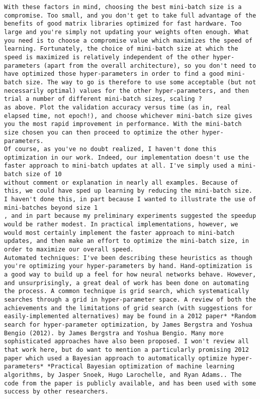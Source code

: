 \begin{lstlisting}
With these factors in mind, choosing the best mini-batch size is a compromise. Too small, and you don't get to take full advantage of the benefits of good matrix libraries optimized for fast hardware. Too large and you're simply not updating your weights often enough. What you need is to choose a compromise value which maximizes the speed of learning. Fortunately, the choice of mini-batch size at which the speed is maximized is relatively independent of the other hyper-parameters (apart from the overall architecture), so you don't need to have optimized those hyper-parameters in order to find a good mini-batch size. The way to go is therefore to use some acceptable (but not necessarily optimal) values for the other hyper-parameters, and then trial a number of different mini-batch sizes, scaling ?
as above. Plot the validation accuracy versus time (as in, real elapsed time, not epoch!), and choose whichever mini-batch size gives you the most rapid improvement in performance. With the mini-batch size chosen you can then proceed to optimize the other hyper-parameters.
Of course, as you've no doubt realized, I haven't done this optimization in our work. Indeed, our implementation doesn't use the faster approach to mini-batch updates at all. I've simply used a mini-batch size of 10
without comment or explanation in nearly all examples. Because of this, we could have sped up learning by reducing the mini-batch size. I haven't done this, in part because I wanted to illustrate the use of mini-batches beyond size 1
, and in part because my preliminary experiments suggested the speedup would be rather modest. In practical implementations, however, we would most certainly implement the faster approach to mini-batch updates, and then make an effort to optimize the mini-batch size, in order to maximize our overall speed.
Automated techniques: I've been describing these heuristics as though you're optimizing your hyper-parameters by hand. Hand-optimization is a good way to build up a feel for how neural networks behave. However, and unsurprisingly, a great deal of work has been done on automating the process. A common technique is grid search, which systematically searches through a grid in hyper-parameter space. A review of both the achievements and the limitations of grid search (with suggestions for easily-implemented alternatives) may be found in a 2012 paper* *Random search for hyper-parameter optimization, by James Bergstra and Yoshua Bengio (2012). by James Bergstra and Yoshua Bengio. Many more sophisticated approaches have also been proposed. I won't review all that work here, but do want to mention a particularly promising 2012 paper which used a Bayesian approach to automatically optimize hyper-parameters* *Practical Bayesian optimization of machine learning algorithms, by Jasper Snoek, Hugo Larochelle, and Ryan Adams.. The code from the paper is publicly available, and has been used with some success by other researchers.

\end{lstlisting}

